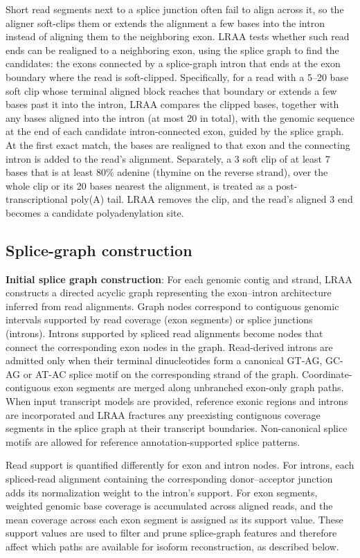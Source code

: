 Short read segments next to a splice junction often fail to align across it, so the aligner soft-clips them or extends the alignment a few bases into the intron instead of aligning them to the neighboring exon. LRAA tests whether such read ends can be realigned to a neighboring exon, using the splice graph to find the candidates: the exons connected by a splice-graph intron that ends at the exon boundary where the read is soft-clipped. Specifically, for a read with a 5--20 base soft clip whose terminal aligned block reaches that boundary or extends a few bases past it into the intron, LRAA compares the clipped bases, together with any bases aligned into the intron (at most 20 in total), with the genomic sequence at the end of each candidate intron-connected exon, guided by the splice graph. At the first exact match, the bases are realigned to that exon and the connecting intron is added to the read's alignment. Separately, a 3\p{} soft clip of at least 7 bases that is at least 80\% adenine (thymine on the reverse strand), over the whole clip or its 20 bases nearest the alignment, is treated as a post-transcriptional poly(A) tail. LRAA removes the clip, and the read's aligned 3\p{} end becomes a candidate polyadenylation site.

\subsection{Splice-graph construction}\label{splice-graph-construction}

\textbf{Initial splice graph construction}: For each genomic contig and strand, LRAA constructs a directed acyclic graph representing the exon--intron architecture inferred from read alignments. Graph nodes correspond to contiguous genomic intervals supported by read coverage (exon segments) or splice junctions (introns). Introns supported by spliced read alignments become nodes that connect the corresponding exon nodes in the graph. Read-derived introns are admitted only when their terminal dinucleotides form a canonical GT-AG, GC-AG or AT-AC splice motif on the corresponding strand of the graph. Coordinate-contiguous exon segments are merged along unbranched exon-only graph paths. When input transcript models are provided, reference exonic regions and introns are incorporated and LRAA fractures any preexisting contiguous coverage segments in the splice graph at their transcript boundaries. Non-canonical splice motifs are allowed for reference annotation-supported splice patterns.

Read support is quantified differently for exon and intron nodes. For introns, each spliced-read alignment containing the corresponding donor--acceptor junction adds its normalization weight to the intron's support. For exon segments, weighted genomic base coverage is accumulated across aligned reads, and the mean coverage across each exon segment is assigned as its support value. These support values are used to filter and prune splice-graph features and therefore affect which paths are available for isoform reconstruction, as described below.

